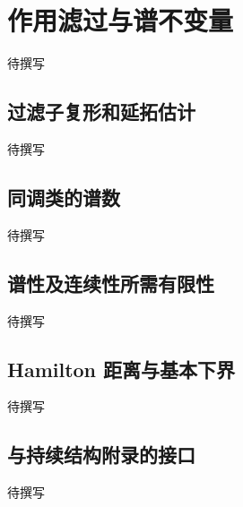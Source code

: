 
% 
% 
% 

\section{作用滤过与谱不变量}
\label{g4:sec:2705}

待撰写

\subsection{过滤子复形和延拓估计}
\label{g4:subsec:2705:01}
待撰写

\subsection{同调类的谱数}
\label{g4:subsec:2705:02}
待撰写

\subsection{谱性及连续性所需有限性}
\label{g4:subsec:2705:03}
待撰写

\subsection{Hamilton 距离与基本下界}
\label{g4:subsec:2705:04}
待撰写

\subsection{与持续结构附录的接口}
\label{g4:subsec:2705:05}
待撰写
